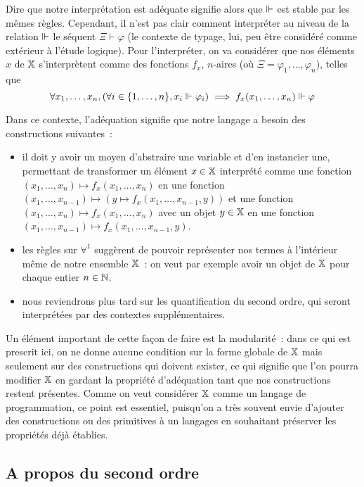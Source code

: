 \documentclass{article}
\begin{document}
Dire que notre interprétation est adéquate signifie alors que $\Vdash$ est stable par les mêmes règles. Cependant, il n'est pas clair comment interpréter au niveau de la relation $\Vdash$ le séquent $\Xi\vdash \varphi$ (le contexte de typage, lui, peu être considéré comme extérieur à l'étude logique). Pour l'interpréter, on va considérer que nos éléments $x$ de $\mathbb X$ s'interprètent comme des fonctions $f_x$, $n$-aires (où $\Xi = \varphi_1,\ldots,\varphi_n$), telles que
\[\forall x_1,\ldots,x_n, (\forall i \in \{1,\ldots,n\}, x_i \Vdash \varphi_i)\implies f_x(x_1,\ldots,x_n)\Vdash\varphi\]

Dans ce contexte, l'adéquation signifie que notre langage a besoin des constructions suivantes~:
\begin{itemize}
    \item il doit y avoir un moyen d'abstraire une variable et d'en instancier une, permettant de transformer un élément $x\in\mathbb X$ interprété comme une fonction $(x_1,\ldots,x_n) \mapsto f_x(x_1,\ldots,x_n)$ en une fonction $(x_1,\ldots,x_{n-1})\mapsto (y\mapsto f_x(x_1,\ldots,x_{n-1},y))$ et une fonction $(x_1,\ldots,x_n)\mapsto f_x(x_1,\ldots,x_n)$ avec un objet $y\in\mathbb X$ en une fonction $(x_1,\ldots,x_{n-1})\mapsto f_x(x_1,\ldots,x_{n-1},y)$.
    \item les règles sur $\forall^1$ suggèrent de pouvoir représenter nos termes à l'intérieur même de notre ensemble $\mathbb X$~: on veut par exemple avoir un objet de $\mathbb X$ pour chaque entier $n\in\mathbb{N}$.
    \item nous reviendrons plus tard sur les quantification du second ordre, qui seront interprétées par des contextes supplémentaires.
\end{itemize}

Un élément important de cette façon de faire est la modularité~: dans ce qui est prescrit ici, on ne donne aucune condition sur la forme globale de $\mathbb X$ mais seulement sur des constructions qui doivent exister, ce qui signifie que l'on pourra modifier $\mathbb X$ en gardant la propriété d'adéquation tant que nos constructions restent présentes. Comme on veut considérer $\mathbb X$ comme un langage de programmation, ce point est essentiel, puisqu'on a très souvent envie d'ajouter des constructions ou des primitives à un langages en souhaitant préserver les propriétés déjà établies.

\subsection{A propos du second ordre}
\end{document}
